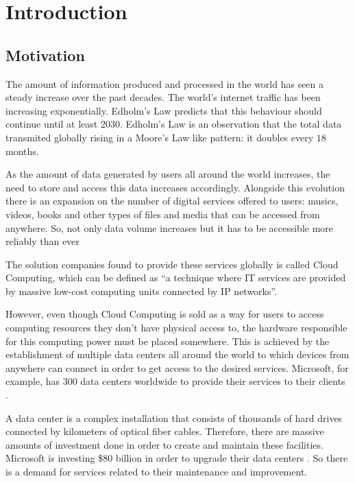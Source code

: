 \chapter{Introduction}\label{chap:introduction}

\section{Motivation}\label{sec:motivation}

The amount of information produced and processed in the world has seen a steady increase over the past decades.
The world's internet traffic has been increasing exponentially.
Edholm's Law \cite{Edholm04} predicts that this behaviour should continue until at least 2030.
Edholm's Law is an observation that the total data transmited globally rising in a Moore's Law like pattern\cite{Moore98}: it doubles every $18$ months.

As the amount of data generated by users all around the world increases, the need to store and access this data increases accordingly.
Alongside this evolution there is an expansion on the number of digital services offered to users: musics, videos, books and other types of files and media that can be accessed from anywhere.
So, not only data volume increases but it has to be accessible more reliably than ever 

The solution companies found to provide these services globally is called Cloud Computing, which can be defined as ``a technique where IT services are provided by massive low-cost computing units connected by IP networks''\cite{Qian09}.

However, even though Cloud Computing is sold as a way for users to access computing resources they don't have physical access to, the hardware responsible for this computing power must be placed somewhere.
This is achieved by the establishment of multiple data centers all around the world to which devices from anywhere can connect in order to get access to the desired services.
Microsoft, for example, has 300 data centers worldwide to provide their services to their clients \cite{MicrosoftDataCenters}.

A data center is a complex installation that consists of thousands of hard drives connected by kilometers of optical fiber cables.
Therefore, there are massive amounts of investment done in order to create and maintain these facilities.
Microsoft is investing \$80 billion in order to upgrade their data centers \cite{MicrosoftDataCenters}.
So there is a demand for services related to their maintenance and improvement.

